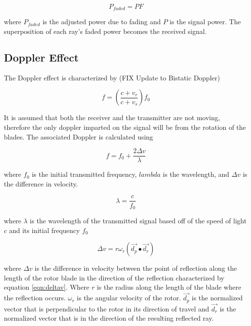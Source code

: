 \begin{equation}
	P_{faded} = PF
	\label{eqn:power_faded}
\end{equation}

where $P_{faded}$ is the adjusted power due to fading and $P$ is the signal power. The superposition of each ray's faded power becomes the received signal.

\subsection{Doppler Effect}
The Doppler effect is characterized by (FIX Update to Bistatic Doppler)

\begin{equation}
	f = \left ( \frac{c + v_r}{c + v_s} \right ) f_0
	\label{eqn:formalDop}
\end{equation}

It is assumed that both the receiver and the transmitter are not moving, therefore the only doppler imparted on the signal will be from the rotation of the blades. The associated Doppler is calculated using

\begin{equation}
	f = f_0 + \frac{2\Delta v}{\lambda} %
	\label{eqn:observedShift}	
\end{equation}

where $f_0$ is the initial transmitted frequency, $lambda$ is the wavelength, and $\Delta v$ is the difference in velocity.

\begin{equation}
	\lambda = \frac{c}{f_0}
	\label{eqn:wavelength}
\end{equation}

where $\lambda$ is the wavelength of the transmitted signal based off of the speed of light $c$ and its initial frequency $f_0$

\begin{equation}
	\Delta v = r \omega_r (\vec{d_p} \bullet \vec{d_r})
	\label{eqn:deltav}
\end{equation}

where $\Delta v$ is the difference in velocity between the point of reflection along the length of the rotor blade in the direction of the reflection characterized by equation \ref{eqn:deltav}. Where $r$ is the radius along the length of the blade where the reflection occurs. $\omega_r$ is the angular velocity of the rotor. $\vec{d_p}$ is the normalized vector that is perpendicular to the rotor in its direction of travel and $\vec{d_r}$ is the normalized vector that is in the direction of the resulting reflected ray.


